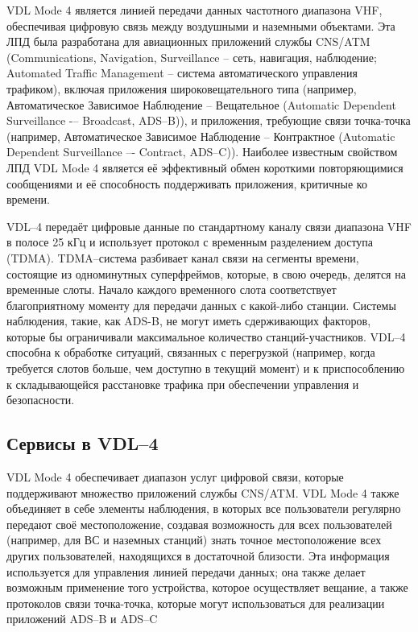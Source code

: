 \documentclass[a4paper,12pt]{report} %
\begin{document}
VDL Mode 4 является линией передачи данных частотного диапазона VHF, обеспечивая
цифровую связь между воздушными и наземными объектами. Эта ЛПД была разработана
для авиационных приложений службы CNS/ATM (Communications, Navigation,
Surveillance -- сеть, навигация, наблюдение; Automated Traffic Management --
система автоматического управления трафиком), включая приложения
широковещательного типа (например, Автоматическое Зависимое Наблюдение –
Вещательное (Automatic Dependent Surveillance -– Broadcast, ADS--B)), и
приложения, требующие связи точка-точка (например, Автоматическое Зависимое
Наблюдение – Контрактное (Automatic Dependent Surveillance –- Contract,
ADS--C)). Наиболее известным свойством ЛПД VDL Mode 4 является её эффективный
обмен короткими повторяющимися сообщениями и её способность поддерживать
приложения, критичные ко времени. 
 
VDL--4 передаёт цифровые данные по стандартному каналу связи диапазона VHF в
полосе 25 кГц и использует протокол с временным разделением доступа (TDMA).
TDMA--система разбивает канал связи на сегменты времени, состоящие из
одноминутных суперфреймов, которые, в свою очередь, делятся на временные слоты.
Начало каждого временного слота соответствует благоприятному моменту для
передачи данных с какой-либо станции. Системы наблюдения, такие, как ADS-B, не
могут иметь сдерживающих факторов, которые бы ограничивали максимальное
количество станций-участников. VDL--4 способна к обработке ситуаций,
связанных с перегрузкой (например, когда требуется слотов больше, чем доступно в
текущий момент) и к приспособлению к складывающейся расстановке трафика при
обеспечении управления и безопасности.

\subsection{Сервисы в VDL--4}

VDL Mode 4 обеспечивает диапазон услуг цифровой связи, которые поддерживают
множество приложений службы CNS/ATM. VDL Mode 4 также объединяет в себе элементы
наблюдения, в которых все пользователи регулярно передают своё местоположение, создавая
возможность для всех пользователей (например, для ВС и наземных станций) знать точное
местоположение всех других пользователей, находящихся в достаточной близости. Эта
информация используется для управления линией передачи данных; она также делает
возможным применение того устройства, которое осуществляет вещание, а также протоколов
связи точка-точка, которые могут использоваться для реализации приложений ADS--B и ADS--C
\end{document}
